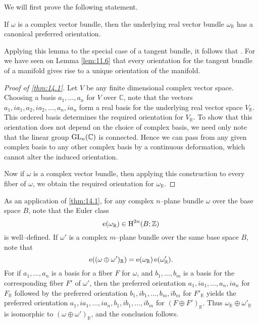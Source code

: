 \documentclass[../main]{subfiles}
\begin{document}
We will first prove the following statement.

\begin{lemma}
\label{lem:14.1}\label{thm:14.1}
If $\omega$ is a complex vector bundle, then the underlying real vector bundle $\omega_{\mathbb R}$ has a canonical preferred orientation. 
\end{lemma}

Applying this lemma to the special case of a tangent bundle, it follows that . For we have seen on Lemma \ref{lem:11.6} that every orientation for the tangent bundle of a manifold gives rise to a unique orientation of the manifold.

\begin{proof}[Proof of \ref{thm:14.1}]
Let $V$ be any finite dimensional complex vector space. Choosing a basis $a_1, \ldots, a_n$ for $V$ over $\mathbb C$, note that the vectors $a_1, ia_1, a_2, i a_2, \ldots, a_n, i a_n$ form a real basis for the underlying real vector space $V_{\mathbb R}$. This ordered basis determines the required orientation for $V_{\mathbb R}$. To show that this orientation does not depend on the choice of complex basis, we need only note that the linear group $\operatorname{GL}_n(\mathbb C)$ is connected. Hence we can pass from any given complex basis to any other complex basis by a continuous deformation, which cannot alter the induced orientation.

Now if $\omega$ is a complex vector bundle, then applying this construction to every fiber of $\omega$, we obtain the required orientation for $\omega_{\mathbb R}$.
\end{proof}

As an application of \ref{thm:14.1}, for any complex $n$--plane bundle $\omega$ over the base space $B$, note that the Euler class \[\operatorname{e}(\omega_{\mathbb R}) \in \operatorname{H}^{2n}(B; \mathbb Z)\] is well--defined. If $\omega'$ is a complex $m$--plane bundle over the same base space $B$, note that \[\operatorname{e}((\omega \oplus \omega')_{\mathbb R}) = \operatorname{e}(\omega_{\mathbb R})\operatorname{e}(\omega'_{\mathbb R}).\] For if $a_1, \ldots, a_n$ is a basis for a fiber $F$ for $\omega$, and $b_1, \ldots, b_m$ is a basis for the corresponding fiber $F'$ of $\omega'$, then the preferred orientation $a_1, i a_1, \ldots, a_n, i a_n$ for $F_{\mathbb R}$ followed by the preferred orientation $b_1, i b_1, \ldots, b_m, i b_m$ for $F'_{\mathbb R}$ yields the preferred orientation $a_1, i a_1, \ldots, i a_n, b_1, i b_1, \ldots, i b_m$ for $(F \oplus F')_{\mathbb R}$. Thus $\omega_{\mathbb R} \oplus \omega'_{\mathbb R}$ is isomorphic  to $(\omega \oplus \omega')_{\mathbb R}$, and the conclusion follows.
\end{document}
